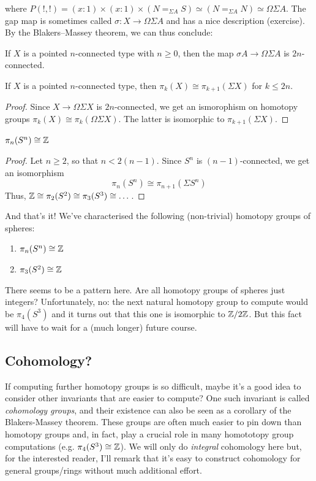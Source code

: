 \documentclass[10pt,oneside,leqno,openright]{memoir}
\begin{document}
%
where $P(!,!) = (x : 1) \times (x : 1) \times (N =_{\Sigma A} S) \simeq (N =_{\Sigma A} N) \simeq \Omega \Sigma A$. The gap map is sometimes called $\sigma : X \to \Omega \Sigma A$ and has a nice description (exercise). By the Blakers--Massey theorem, we can thus conclude:


\begin{theorem}[Freudenthal]
  \label{thm:freudenthal}
  If $X$ is a pointed $n$-connected type with $n\ge0$, then  the map $\sigma A \to \Omega \Sigma A$ is $2n$-connected. 
\end{theorem}
\begin{corollary}
  \label{thm:freudenthal}
  If $X$ is a pointed $n$-connected type, then $\pi_k(X) \cong \pi_{k+1}(\Sigma X)$ for $k \leq 2n$.
\end{corollary}
\begin{proof}
  Since $X \to \Omega \Sigma X$ is $2n$-connected, we get an ismorophism on homotopy groups $\pi_k(X) \cong \pi_{k}(\Omega \Sigma X)$. The latter is isomorphic to $\pi_{k+1}(\Sigma X)$.
\end{proof}
\begin{corollary}
  $\pi_n(S^n) \cong \mathbb{Z}$
\end{corollary}
\begin{proof}
  Let $n \geq 2$, so that $n < 2(n-1)$. Since $S^n$ is $(n-1)$-connected, we get an isomorphism \[\pi_n(S^n) \cong \pi_{n+1}(\Sigma S^n) \]
  Thus, $\mathbb{Z} \cong \pi_2(S^2) \cong \pi_3(S^3) \cong \dots$.
\end{proof}
And that's it! We've characterised the following (non-trivial) homotopy groups of spheres:
%
\begin{enumerate}
\item $\pi_n(S^n) \cong \mathbb{Z}$
\item $\pi_3(S^2) \cong \mathbb{Z}$
\end{enumerate}
%
There seems to be a pattern here.
%
Are all homotopy groups of spheres just integers? Unfortunately, no:
the next natural homotopy group to compute would be $\pi_4(S^3)$ and
it turns out that this one is isomorphic to $\mathbb{Z}/2\mathbb{Z}$.
%
But this fact will have to wait for a (much longer) future course.

\subsection{Cohomology?}
%
If computing further homotopy groups is so difficult, maybe it's a good idea to consider other invariants that are easier to compute?
%
One such invariant is called \emph{cohomology groups}, and their existence can also be seen as a corollary of the Blakers-Massey theorem.
%
These groups are often much easier to pin down than homotopy groups and, in fact, play a crucial role in many homototopy group computations (e.g. $\pi_4(S^3)\cong \mathbb{Z}$).
%
We will only do \emph{integral} cohomology here but, for the interested reader, I'll remark that it's easy to construct cohomology for general groups/rings without much additional effort.
\end{document}
